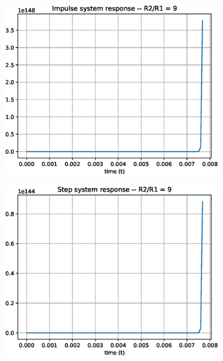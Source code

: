 \begin{enumerate}[label=\arabic*.,ref=\theenumi]
\begin{figure}[!ht]
\centering
\includegraphics[width=\columnwidth]{./figs/ee18btech11044/ee18btech11044_3_10.eps}
\caption{}
\label{fig:ee18btech11044_3_10}
\end{figure}

\begin{figure}[!ht]
\centering
\includegraphics[width=\columnwidth]{./figs/ee18btech11044/ee18btech11044_3_11.eps}
\caption{}
\label{fig:ee18btech11044_3_11}
\end{figure}


\end{enumerate}
